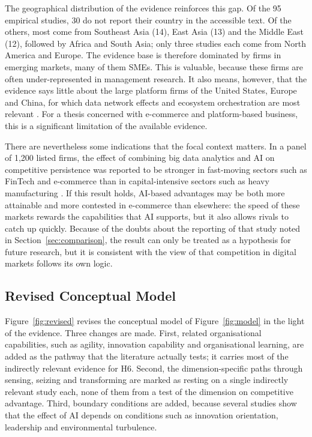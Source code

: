 The geographical distribution of the evidence reinforces this gap. Of the 95 empirical studies, 30 do not report their country in the accessible text. Of the others, most come from Southeast Asia (14), East Asia (13) and the Middle East (12), followed by Africa and South Asia; only three studies each come from North America and Europe. The evidence base is therefore dominated by firms in emerging markets, many of them SMEs. This is valuable, because these firms are often under-represented in management research. It also means, however, that the evidence says little about the large platform firms of the United States, Europe and China, for which data network effects and ecosystem orchestration are most relevant \parencite{gregory2021, rietveld2021}. For a thesis concerned with e-commerce and platform-based business, this is a significant limitation of the available evidence.

There are nevertheless some indications that the focal context matters. In a panel of 1,200 listed firms, the effect of combining big data analytics and AI on competitive persistence was reported to be stronger in fast-moving sectors such as FinTech and e-commerce than in capital-intensive sectors such as heavy manufacturing \parencite{dzreke2025}. If this result holds, AI-based advantages may be both more attainable and more contested in e-commerce than elsewhere: the speed of these markets rewards the capabilities that AI supports, but it also allows rivals to catch up quickly. Because of the doubts about the reporting of that study noted in Section~\ref{sec:comparison}, the result can only be treated as a hypothesis for future research, but it is consistent with the view of \textcite{cennamo2021} that competition in digital markets follows its own logic.

\subsection{Revised Conceptual Model}
\label{sec:revised}

Figure~\ref{fig:revised} revises the conceptual model of Figure~\ref{fig:model} in the light of the evidence. Three changes are made. First, related organisational capabilities, such as agility, innovation capability and organisational learning, are added as the pathway that the literature actually tests; it carries most of the indirectly relevant evidence for H6. Second, the dimension-specific paths through sensing, seizing and transforming are marked as resting on a single indirectly relevant study each, none of them from a test of the dimension on competitive advantage. Third, boundary conditions are added, because several studies show that the effect of AI depends on conditions such as innovation orientation, leadership and environmental turbulence.

